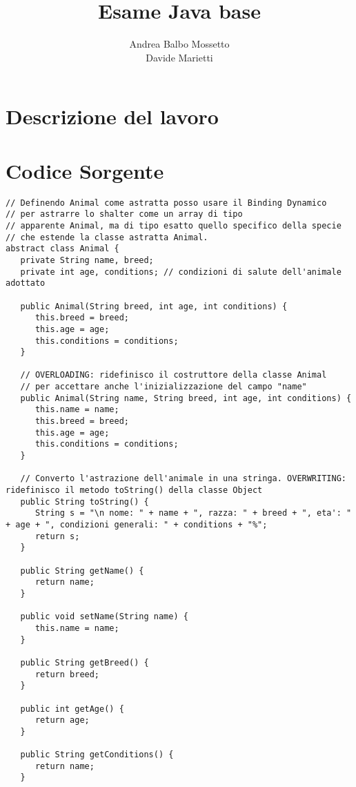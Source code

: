 \documentclass{article}
\title{Esame Java base}
\author{Andrea Balbo Mossetto \\ Davide Marietti}
\date{}
\begin{document}
	\maketitle
	\newpage
	
	\tableofcontents
	\newpage
	
	\section{Descrizione del lavoro}
	
	\newpage
	
	\appendix
	\section{Codice Sorgente}
	
	\begin{lstlisting}[caption={Animal.java}]
// Definendo Animal come astratta posso usare il Binding Dynamico 
// per astrarre lo shalter come un array di tipo
// apparente Animal, ma di tipo esatto quello specifico della specie 
// che estende la classe astratta Animal.
abstract class Animal {
   private String name, breed;
   private int age, conditions; // condizioni di salute dell'animale adottato

   public Animal(String breed, int age, int conditions) {
      this.breed = breed;
      this.age = age;
      this.conditions = conditions;
   }

   // OVERLOADING: ridefinisco il costruttore della classe Animal 
   // per accettare anche l'inizializzazione del campo "name"
   public Animal(String name, String breed, int age, int conditions) {
      this.name = name;
      this.breed = breed;
      this.age = age;
      this.conditions = conditions;
   }

   // Converto l'astrazione dell'animale in una stringa. OVERWRITING: ridefinisco il metodo toString() della classe Object
   public String toString() {
      String s = "\n nome: " + name + ", razza: " + breed + ", eta': " + age + ", condizioni generali: " + conditions + "%";
      return s;
   }

   public String getName() {
      return name;
   }

   public void setName(String name) {
      this.name = name;
   }

   public String getBreed() {
      return breed;
   }

   public int getAge() {
      return age;
   }

   public String getConditions() {
      return name;
   }


\end{lstlisting}
\end{document}
